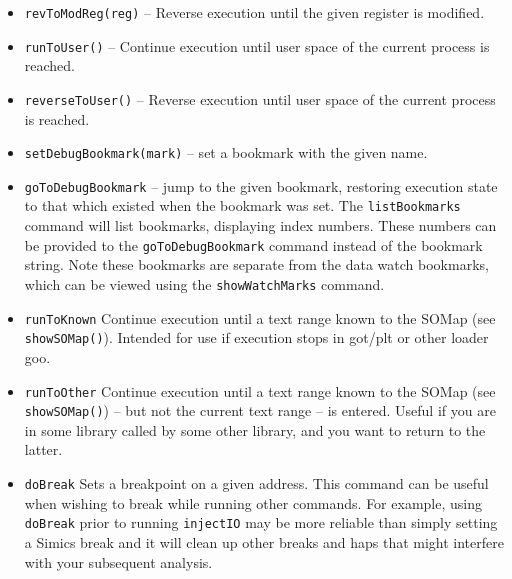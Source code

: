 \documentclass[titlepage]{article}
\begin{document}
\begin{itemize}
\item {\tt revToModReg(reg)} – Reverse execution until the given register is modified.


\item {\tt runToUser()} – Continue execution until user space of the current process is reached.

\item {\tt reverseToUser()} – Reverse execution until user space of the current process is reached.

\item {\tt setDebugBookmark(mark)} – set a bookmark with the given name.

\item {\tt goToDebugBookmark} – jump to the given bookmark, restoring execution state to that which existed when the bookmark was set.  The
{\tt listBookmarks} command will list bookmarks, displaying  index numbers.  These numbers can be provided to the {\tt goToDebugBookmark} command instead
of the bookmark string.  Note these bookmarks are separate from the data watch bookmarks, which can be viewed using the {\tt showWatchMarks} command.

\item {\tt runToKnown} Continue execution until a text range known to the SOMap (see {\tt showSOMap()}).  Intended for use if execution stops in got/plt 
or other loader goo.

\item {\tt runToOther} Continue execution until a text range known to the SOMap (see {\tt showSOMap()}) -- but not the current text range -- is entered.
Useful if you are in some library called by some other library, and you want to return to the latter.

\item {\tt doBreak} Sets a breakpoint on a given address.  This command can be useful when wishing to break while running other commands.  For example,
using {\tt doBreak} prior to running {\tt injectIO} may be more reliable than simply setting a Simics break and it will clean up other breaks and haps that 
might interfere with your subsequent analysis.

\end{itemize}
\end{document}
